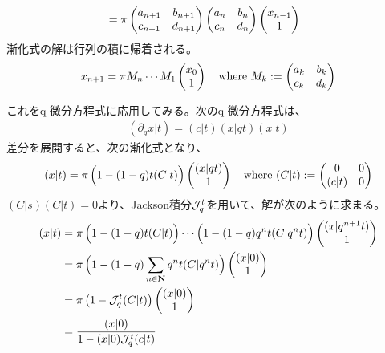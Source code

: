 {\begin{equation*}
\begin{split}
		&= \pi\begin{pmatrix}
			a_{n+1} & b_{n+1} \\ c_{n+1} & d_{n+1} \\
		\end{pmatrix}\begin{pmatrix}
			a_n & b_n \\ c_n & d_n \\
		\end{pmatrix}\begin{pmatrix}{x_{n-1}}\\{1}\end{pmatrix}
	\end{split}\end{equation*}
	漸化式の解は行列の積に帰着される。
	\begin{equation*}\begin{split}
		x_{n+1} = \pi M_n\cdots M_1\begin{pmatrix}{x_0}\\{1}\end{pmatrix}
		\quad\text{where } M_k := \begin{pmatrix}
			a_k & b_k \\ c_k & d_k \\
		\end{pmatrix}
	\end{split}\end{equation*}

	これをq-微分方程式に応用してみる。次のq-微分方程式は、
	\begin{equation*}\begin{split}
		(\partial_qx|t) = (c|t)(x|qt)(x|t)
	\end{split}\end{equation*}
	差分を展開すると、次の漸化式となり、
	\begin{equation*}\begin{split}
		(x|t) = \pi\mathinner{\Bigl({1 - (1-q)t(C|t)}\Bigr)}\begin{pmatrix}{(x|qt)}\\{1}\end{pmatrix} \quad\text{where } 
		(C|t) := \begin{pmatrix}
			0 & 0 \\ (c|t) & 0
		\end{pmatrix}
	\end{split}\end{equation*}
	$(C|s)(C|t)=0$より、Jackson積分${{\mathcal{J}}}_q^t$を用いて、解が次のように求まる。
	\begin{equation*}\begin{split}
		(x|t) &= \pi\mathinner{\Bigl({1 - (1-q)t(C|t)}\Bigr)}\cdots
			\mathinner{\Bigl({1 - (1-q)q^nt(C|q^nt)}\Bigr)}\begin{pmatrix}{(x|q^{n+1}t)}\\{1}\end{pmatrix} \\
		&= \pi\mathinner{\Bigl({1 - (1-q)\sum_{n\in\ensuremath{\mathbf{N}}}q^nt(C|q^nt)}\Bigr)}\begin{pmatrix}{(x|0)}\\{1}\end{pmatrix} \\
		&= \pi\mathinner{\left({1 - {\ensuremath{{\mathcal{J}}}}_q^t(C|t)}\right)}\begin{pmatrix}{(x|0)}\\{1}\end{pmatrix} \\
		&= \frac{(x|0)}{1 - (x|0){{\mathcal{J}}}_q^t(c|t)}
	\end{split}\end{equation*}

}
